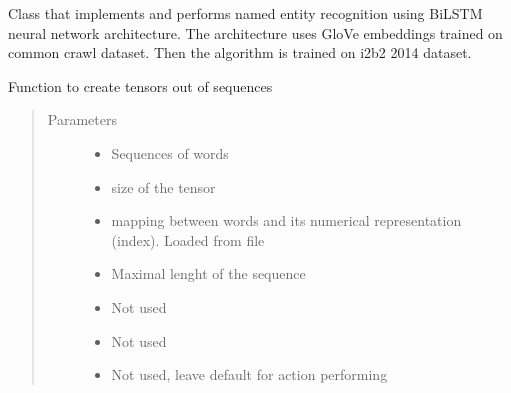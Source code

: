 \documentclass[letterpaper,10pt,english]{sphinxmanual}
\begin{document}
\begin{fulllineitems}
\label{\detokenize{contents:ner_plugins.NER_BiLSTM_Glove_i2b2.NER_BiLSTM_Glove_i2b2}}
Class that implements and performs named entity recognition using BiLSTM neural network architecture. The architecture uses GloVe
embeddings trained on common crawl dataset. Then the algorithm is trained on i2b2 2014 dataset.

\begin{fulllineitems}
\label{\detokenize{contents:ner_plugins.NER_BiLSTM_Glove_i2b2.NER_BiLSTM_Glove_i2b2.build_tensor}}
Function to create tensors out of sequences
\begin{quote}\begin{description}
\item[{Parameters}] \leavevmode\begin{itemize}
\item {} 
 \textendash{} Sequences of words

\item {} 
 \textendash{} size of the tensor

\item {} 
 \textendash{} mapping between words and its numerical representation (index). Loaded from file

\item {} 
 \textendash{} Maximal lenght of the sequence

\item {} 
 \textendash{} Not used

\item {} 
 \textendash{} Not used

\item {} 
 \textendash{} Not used, leave default for action performing


\end{itemize}
\end{description}
\end{quote}
\end{fulllineitems}
\end{fulllineitems}
\end{document}

